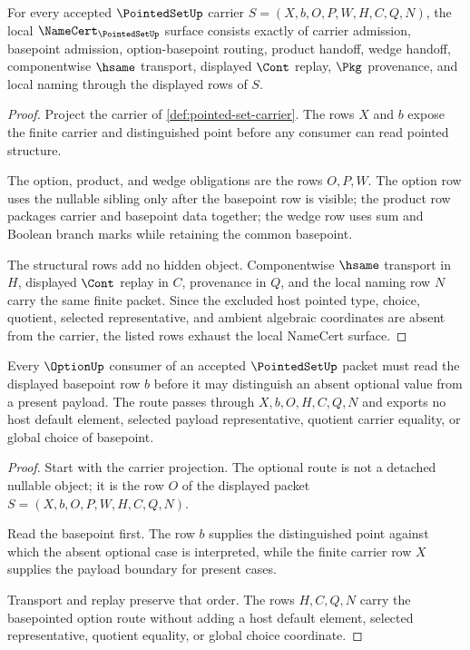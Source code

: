 \begin{theorem}
\label{thm:pointed-set-namecert-obligations}
For every accepted $\PointedSetUp$ carrier $S=(X,b,O,P,W,H,C,Q,N)$, the local $\NameCert_{\PointedSetUp}$ surface consists exactly of carrier admission, basepoint admission, option-basepoint routing, product handoff, wedge handoff, componentwise $\hsame$ transport, displayed $\Cont$ replay, $\Pkg$ provenance, and local naming through the displayed rows of $S$.
\end{theorem}
\begin{proof}
Project the carrier of \autoref{def:pointed-set-carrier}. The rows $X$ and $b$ expose the finite carrier and distinguished point before any consumer can read pointed structure.

The option, product, and wedge obligations are the rows $O,P,W$. The option row uses the nullable sibling only after the basepoint row is visible; the product row packages carrier and basepoint data together; the wedge row uses sum and Boolean branch marks while retaining the common basepoint.

The structural rows add no hidden object. Componentwise $\hsame$ transport in $H$, displayed $\Cont$ replay in $C$, provenance in $Q$, and the local naming row $N$ carry the same finite packet. Since the excluded host pointed type, choice, quotient, selected representative, and ambient algebraic coordinates are absent from the carrier, the listed rows exhaust the local NameCert surface.
\end{proof}

\begin{theorem}
\label{thm:pointed-set-option-basepoint-route}
Every $\OptionUp$ consumer of an accepted $\PointedSetUp$ packet must read the displayed basepoint row $b$ before it may distinguish an absent optional value from a present payload. The route passes through $X,b,O,H,C,Q,N$ and exports no host default element, selected payload representative, quotient carrier equality, or global choice of basepoint.
\end{theorem}
\begin{proof}
Start with the carrier projection. The optional route is not a detached nullable object; it is the row $O$ of the displayed packet $S=(X,b,O,P,W,H,C,Q,N)$.

Read the basepoint first. The row $b$ supplies the distinguished point against which the absent optional case is interpreted, while the finite carrier row $X$ supplies the payload boundary for present cases.

Transport and replay preserve that order. The rows $H,C,Q,N$ carry the basepointed option route without adding a host default element, selected representative, quotient equality, or global choice coordinate.
\end{proof}

